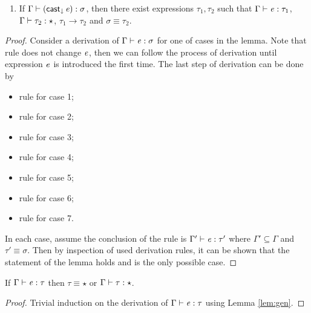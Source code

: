 \begin{lem}
\begin{enumerate}[(1)]
	\item If $\Gamma  \vdash  (  \mathsf{cast}_{\downarrow} \, \mathit{e}  )  :  \sigma$, then there exist expressions $\tau_{{\mathrm{1}}},\tau_{{\mathrm{2}}}$ such that $\Gamma  \vdash  \mathit{e}  :  \tau_{{\mathrm{1}}}$, $\Gamma  \vdash  \tau_{{\mathrm{2}}}  :  \star$, $\tau_{{\mathrm{1}}}  \longrightarrow  \tau_{{\mathrm{2}}}$ and $\sigma  \equiv  \tau_{{\mathrm{2}}}$.
\end{enumerate}
\end{lem}

\begin{proof}
    Consider a derivation of $\Gamma  \vdash  \mathit{e}  :  \sigma$ for one of cases in the lemma. Note that rule  does not change $\mathit{e}$, then we can follow the process of derivation until expression $\mathit{e}$ is introduced the first time. The last step of derivation can be done by
    \begin{itemize}
        \item rule  for case 1;
        \item rule  for case 2;
        \item rule  for case 3;
        \item rule  for case 4;
        \item rule  for case 5;
        \item rule  for case 6;
        \item rule  for case 7.
    \end{itemize}
    In each case, assume the conclusion of the rule is $\Gamma'  \vdash  \mathit{e}  :  \tau'$ where $\Gamma' \subseteq \Gamma$ and $\tau'  \equiv  \sigma$. Then by inspection of used derivation rules, it can be shown that the statement of the lemma holds and is the only possible case.
\end{proof}

\begin{lem}\label{lem:corrtyp}
    If $\Gamma  \vdash  \mathit{e}  :  \tau$ then $\tau  \equiv  \star$ or $\Gamma  \vdash  \tau  :  \star$.
\end{lem}

\begin{proof}
    Trivial induction on the derivation of $\Gamma  \vdash  \mathit{e}  :  \tau$ using Lemma \ref{lem:gen}.
\end{proof}


